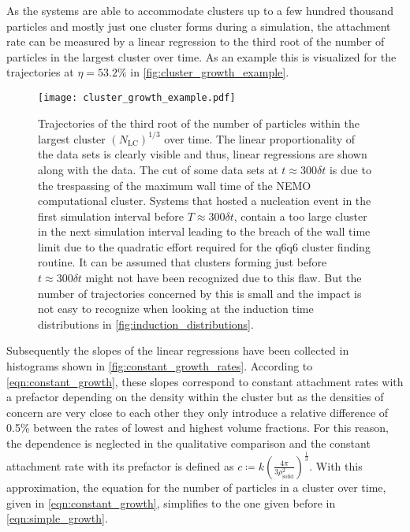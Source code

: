 As the systems are able to accommodate clusters up to a few hundred thousand particles and mostly just one cluster forms during a simulation, the attachment rate can be measured by a linear regression to the third root of the number of particles in the largest cluster over time. As an example this is visualized for the trajectories at $\eta=53.2\%$ in \autoref{fig:cluster_growth_example}.

\begin{figure}[h]
\centering
\texttt{[image: cluster\_growth\_example.pdf]}
\caption[Largest cluster trajectories from production data with constant attachment rates]{Trajectories of the third root of the number of particles within the largest cluster $(N_{\text{LC}})^{1/3}$ over time. The linear proportionality of the data sets is clearly visible and thus, linear regressions are shown along with the data. The cut of some data sets at $t \approx 300 \delta t $ is due to the trespassing of the maximum wall time of the NEMO computational cluster. Systems that hosted a nucleation event in the first simulation interval before $T \approx 300\delta t  $, contain a too large cluster in the next simulation interval leading to the breach of the wall time limit due to the quadratic effort required for the q6q6 cluster finding routine. It can be assumed that clusters forming just before $t \approx 300 \delta t$ might not have been recognized due to this flaw. But the number of trajectories concerned by this is small and the impact is not easy to recognize when looking at the induction time distributions in \autoref{fig:induction_distributions}.}
\label{fig:cluster_growth_example}
\end{figure}

Subsequently the slopes of the linear regressions have been collected in histograms shown in \autoref{fig:constant_growth_rates}. According to \autoref{eqn:constant_growth}, these slopes correspond to constant attachment rates with a prefactor depending on the density within the cluster but as the densities of concern are very close to each other they only introduce a relative difference of 0.5\% between the rates of lowest and highest volume fractions. For this reason, the dependence is neglected in the qualitative comparison and the constant attachment rate with its prefactor is defined as $ c \coloneqq k \left( \frac{4 \pi}{3 \rho_{\text{solid}}^2} \right)^\frac{1}{3} $. With this approximation, the equation for the number of particles in a cluster over time, given in \autoref{eqn:constant_growth}, simplifies to the one given before in \autoref{eqn:simple_growth}.\\ 

